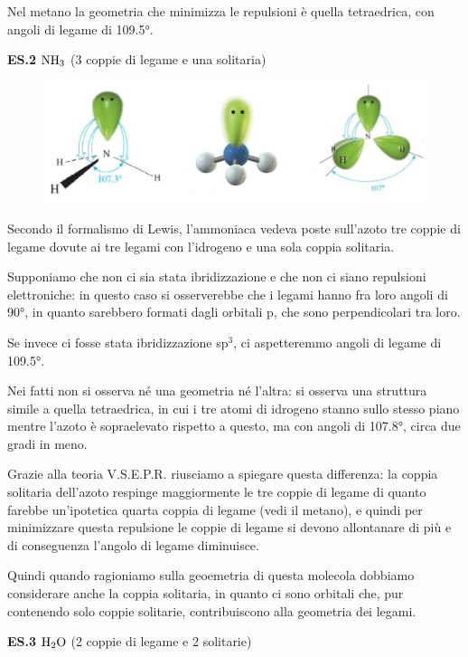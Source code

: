 \vspace{0.2cm}Nel metano la geometria che minimizza le repulsioni è quella tetraedrica, con angoli di legame di 109.5°.

\vspace{0.2cm}\textbf{ES.2} $\rm NH_3$ (3 coppie di legame e una solitaria)

\begin{figure}[H]
    \centering
    \includegraphics[width=12cm]{immagini/ammoniaca.png}
\end{figure}
    
Secondo il formalismo di Lewis, l'ammoniaca vedeva poste sull'azoto tre coppie di legame dovute ai tre legami con l'idrogeno e una sola coppia solitaria.

Supponiamo che non ci sia stata ibridizzazione e che non ci siano repulsioni elettroniche: in questo caso si osserverebbe che i legami hanno fra loro angoli di 90°, in quanto sarebbero formati dagli orbitali p, che sono perpendicolari tra loro.
    
Se invece ci fosse stata ibridizzazione sp$^3$, ci aspetteremmo angoli di legame di 109.5°.
    
Nei fatti non si osserva né una geometria né l'altra: si osserva una struttura simile a quella tetraedrica, in cui i tre atomi di idrogeno stanno sullo stesso piano mentre l'azoto è sopraelevato rispetto a questo, ma con angoli di 107.8°, circa due gradi in meno.
    
Grazie alla teoria V.S.E.P.R. riusciamo a spiegare questa differenza: la coppia solitaria dell'azoto respinge maggiormente le tre coppie di legame di quanto farebbe un'ipotetica quarta coppia di legame (vedi il metano), e quindi per minimizzare questa repulsione le coppie di legame si devono allontanare di più e di conseguenza l'angolo di legame diminuisce.

Quindi quando ragioniamo sulla geoemetria di questa molecola dobbiamo considerare anche la coppia solitaria, in quanto ci sono orbitali che, pur contenendo solo coppie solitarie, contribuiscono alla geometria dei legami.

\vspace{0.2cm}\textbf{ES.3} $\rm H_2O$ (2 coppie di legame e 2 solitarie)


